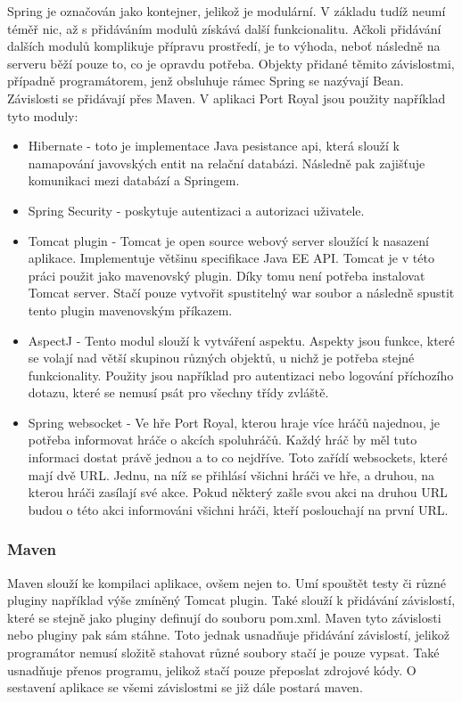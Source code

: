 \documentclass[czech,master,public,dept460,male,cpdeclaration,twoside]{diploma}
\begin{document}
Spring je označován jako kontejner, jelikož je modulární. V základu tudíž neumí téměř nic, až s přidáváním modulů získává další funkcionalitu. Ačkoli  přidávání dalších modulů komplikuje přípravu prostředí, je to výhoda, neboť následně na serveru běží pouze to, co je opravdu potřeba. Objekty přidané těmito závislostmi, případně programátorem, jenž obsluhuje rámec Spring se nazývají Bean. Závislosti se přidávají přes Maven. V aplikaci Port Royal jsou použity například tyto moduly: \cite{spring}
\begin{itemize}
	\item Hibernate - toto je implementace Java pesistance api, která slouží k namapování javovských entit na relační databázi. Následně pak zajišťuje komunikaci mezi databází a Springem.
	\item Spring Security - poskytuje autentizaci a autorizaci uživatele.
	\item Tomcat plugin - Tomcat je open source webový server sloužící k nasazení aplikace. Implementuje většinu specifikace Java EE API. Tomcat je v této práci použit jako mavenovský plugin. Díky tomu není potřeba instalovat Tomcat server. Stačí pouze vytvořit spustitelný war soubor a následně spustit tento plugin mavenovským příkazem.
	\item AspectJ - Tento modul slouží k vytváření aspektu. Aspekty jsou funkce, které se volají nad větší skupinou různých objektů, u nichž je potřeba stejné funkcionality. Použity jsou například pro autentizaci nebo logování příchozího dotazu, které se nemusí psát pro všechny třídy zvláště.
	\item Spring websocket - Ve hře Port Royal, kterou hraje více hráčů najednou, je potřeba informovat hráče o akcích spoluhráčů. Každý hráč by měl tuto informaci dostat právě jednou a to co nejdříve. Toto zařídí websockets, které mají dvě URL. Jednu, na níž se přihlásí všichni hráči ve hře, a druhou, na kterou hráči zasílají své akce. Pokud některý zašle svou akci na druhou URL budou o této akci informováni všichni hráči, kteří poslouchají na první URL.
\end{itemize}

\subsubsection{Maven}
Maven slouží ke kompilaci aplikace, ovšem nejen to. Umí spouštět testy či různé pluginy například výše zmíněný Tomcat plugin. Také slouží k přidávání závislostí, které se stejně jako pluginy definují do souboru pom.xml. Maven tyto závislosti nebo pluginy pak sám stáhne. Toto jednak usnadňuje přidávání závislostí, jelikož programátor nemusí složitě stahovat různé soubory stačí je pouze vypsat. Také usnadňuje přenos programu, jelikož stačí pouze přeposlat zdrojové kódy. O sestavení aplikace se všemi závislostmi se již dále postará maven. \cite{maven}
\end{document}
